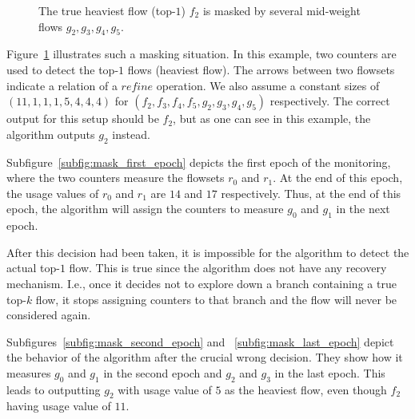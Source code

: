 \begin{figure}
{
    }
    \caption[An example of masking the top-$1$ flow]{The true heaviest flow (top-$1$) $f_2$ is masked by several mid-weight flows $g_2, g_3, g_4, g_5$.}
    \label{fig:mask}
\end{figure}

Figure~\ref{fig:mask} illustrates such a masking situation. In this example, two counters are used to detect the top-$1$ flows (heaviest flow). The arrows between two flowsets indicate a relation of a $refine$ operation. We also assume a constant sizes of $(11, 1, 1, 1, 5, 4, 4, 4)$ for $(f_2, f_3, f_4, f_5, g_2, g_3, g_4, g_5)$ respectively. The correct output for this setup should be $f_2$, but as one can see in this example, the algorithm outputs $g_2$ instead.

Subfigure~\ref{subfig:mask_first_epoch} depicts the first epoch of the monitoring, where the two counters measure the flowsets $r_0$ and $r_1$. At the end of this epoch, the usage values of $r_0$ and $r_1$ are $14$ and $17$ respectively. Thus, at the end of this epoch, the algorithm will assign the counters to measure $g_0$ and $g_1$ in the next epoch.

After this decision had been taken, it is impossible for the algorithm to detect the actual top-$1$ flow. This is true since the algorithm does not have any recovery mechanism. I.e., once it decides not to explore down a branch containing a true top-$k$ flow, it stops assigning counters to that branch and the flow will never be considered again.

Subfigures~\ref{subfig:mask_second_epoch} and ~\ref{subfig:mask_last_epoch} depict the behavior of the algorithm after the crucial wrong decision. They show how it measures $g_0$ and $g_1$ in the second epoch and $g_2$ and $g_3$ in the last epoch. This leads to outputting $g_2$ with usage value of $5$ as the heaviest flow, even though $f_2$ having usage value of $11$.

